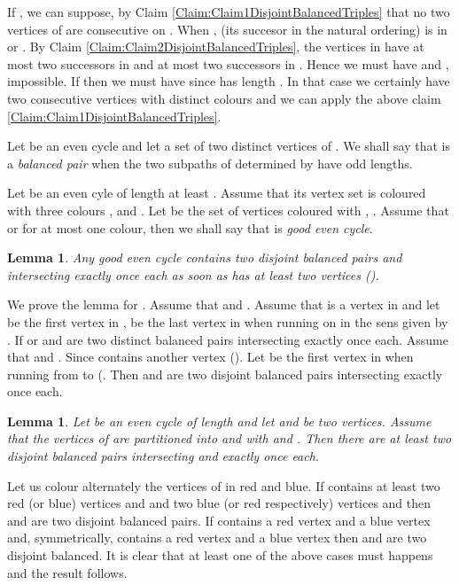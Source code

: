 \documentclass{elsart}
\theoremstyle{plain} \theoremheaderfont{\scshape}
\newtheorem{Lem}[Thm]{\bf Lemma}
\newenvironment{Prf}{{\bf \noindent Proof } }{\hfill\\}
\begin{document}
\begin{Prf}
If , we can suppose, by Claim
\ref{Claim:Claim1DisjointBalancedTriples} that no two vertices of
 are consecutive on . When ,  (its succesor
in the natural ordering) is in  or . By Claim
\ref{Claim:Claim2DisjointBalancedTriples}, the vertices in 
have at most two successors in  and at most two successors in
. Hence we must have  and ,
impossible. If  then we must have   since
 has length . In that case we certainly have two consecutive
vertices with distinct colours and we can apply the above claim
\ref{Claim:Claim1DisjointBalancedTriples}.
\end{Prf}

Let  be an even cycle and let  a set of two distinct
vertices of . We shall say that  is a {\em balanced pair} when
the two subpaths of  determined by  have odd lengths.

Let  be an even cyle of length at least
. Assume that its vertex set is coloured with three colours ,
 and . Let   be  the set of vertices coloured with ,
. Assume that   or  for at most one colour,
then we shall say that  is {\em good even cycle}.

\begin{Lem}\label{Lemma:DisjointBalancedPairs}  Any good even cycle 
contains two disjoint balanced pairs  and  intersecting
  exactly once each as soon as  has at least two vertices
().
\end{Lem}
\begin{Prf}
We prove the lemma for . Assume that  and . Assume that  is a vertex in  and let  be the
first vertex in ,  be the last vertex in  when
running on   in the sens given by . If  or   and  are two
distinct balanced pairs intersecting  exactly once each. Assume
that  and . Since  contains another vertex 
(). Let  be the first vertex in  when running
from  to  (. Then  and
 are two disjoint balanced pairs intersecting
 exactly once each.
\end{Prf}

\begin{Lem}\label{Lemma:DisjointBalancedPairsSpecialEvenCycle}  Let
 be an even cycle of length  and let  and  be
two vertices. Assume that the vertices of  are
partitioned into  and  with  and .
Then there are at least two disjoint balanced pairs intersecting 
and  exactly once each.
\end{Lem}
\begin{Prf}
Let us colour alternately the vertices of  in red and blue. If
 contains at least two red (or blue) vertices  and  and 
two blue (or red respectively) vertices  and  then
 and  are two disjoint balanced pairs. If
 contains a red vertex  and a blue vertex  and,
symmetrically,  contains a red vertex  and a blue vertex 
then  and  are two disjoint balanced. It is
clear that at least one of the above cases must happens and the
result follows.
\end{Prf}
\end{document}
